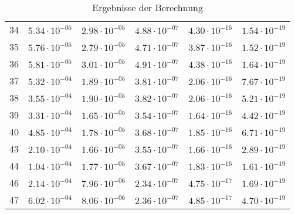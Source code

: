 \begin{table}[h]
\begin{tabular}{llllll}
		34 &$\mathrm{5.34 \cdot 10^{-05}}$ & $\mathrm{2.98 \cdot 10^{-05}}$ & $\mathrm{4.88 \cdot 10^{-07}}$ & $\mathrm{4.30 \cdot 10^{-16}}$ & $\mathrm{1.54 \cdot 10^{-19}}$ \\
		35 &$\mathrm{5.76 \cdot 10^{-05}}$ & $\mathrm{2.79 \cdot 10^{-05}}$ & $\mathrm{4.71 \cdot 10^{-07}}$ & $\mathrm{3.87 \cdot 10^{-16}}$ & $\mathrm{1.52 \cdot 10^{-19}}$ \\
		36 &$\mathrm{5.81 \cdot 10^{-05}}$ & $\mathrm{3.01 \cdot 10^{-05}}$ & $\mathrm{4.91 \cdot 10^{-07}}$ & $\mathrm{4.38 \cdot 10^{-16}}$ & $\mathrm{1.64 \cdot 10^{-19}}$ \\
		37 &$\mathrm{5.32 \cdot 10^{-04}}$ & $\mathrm{1.89 \cdot 10^{-05}}$ & $\mathrm{3.81 \cdot 10^{-07}}$ & $\mathrm{2.06 \cdot 10^{-16}}$ & $\mathrm{7.67 \cdot 10^{-19}}$ \\
		38 &$\mathrm{3.55 \cdot 10^{-04}}$ & $\mathrm{1.90 \cdot 10^{-05}}$ & $\mathrm{3.82 \cdot 10^{-07}}$ & $\mathrm{2.06 \cdot 10^{-16}}$ & $\mathrm{5.21 \cdot 10^{-19}}$ \\
		39 &$\mathrm{3.31 \cdot 10^{-04}}$ & $\mathrm{1.65 \cdot 10^{-05}}$ & $\mathrm{3.54 \cdot 10^{-07}}$ & $\mathrm{1.64 \cdot 10^{-16}}$ & $\mathrm{4.42 \cdot 10^{-19}}$ \\
		40 &$\mathrm{4.85 \cdot 10^{-04}}$ & $\mathrm{1.78 \cdot 10^{-05}}$ & $\mathrm{3.68 \cdot 10^{-07}}$ & $\mathrm{1.85 \cdot 10^{-16}}$ & $\mathrm{6.71 \cdot 10^{-19}}$ \\
		43 &$\mathrm{2.10 \cdot 10^{-04}}$ & $\mathrm{1.66 \cdot 10^{-05}}$ & $\mathrm{3.55 \cdot 10^{-07}}$ & $\mathrm{1.66 \cdot 10^{-16}}$ & $\mathrm{2.89 \cdot 10^{-19}}$ \\
		44 &$\mathrm{1.04 \cdot 10^{-04}}$ & $\mathrm{1.77 \cdot 10^{-05}}$ & $\mathrm{3.67 \cdot 10^{-07}}$ & $\mathrm{1.83 \cdot 10^{-16}}$ & $\mathrm{1.61 \cdot 10^{-19}}$ \\
		46 &$\mathrm{2.14 \cdot 10^{-04}}$ & $\mathrm{7.96 \cdot 10^{-06}}$ & $\mathrm{2.34 \cdot 10^{-07}}$ & $\mathrm{4.75 \cdot 10^{-17}}$ & $\mathrm{1.69 \cdot 10^{-19}}$ \\
		47 &$\mathrm{6.02 \cdot 10^{-04}}$ & $\mathrm{8.06 \cdot 10^{-06}}$ & $\mathrm{2.36 \cdot 10^{-07}}$ & $\mathrm{4.85 \cdot 10^{-17}}$ & $\mathrm{4.70 \cdot 10^{-19}}$ \\
		\bottomrule
	\end{tabular}
	\caption{Ergebnisse der Berechnung}
	\label{tab:ergebnisse}
\end{table}
